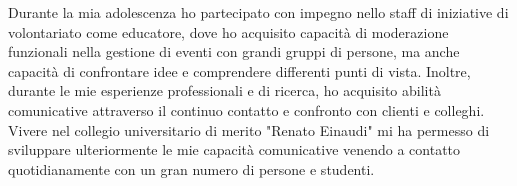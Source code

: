 {\begin{cvskills}


\end{cvskills}
\vspace{-5mm}
\begin{cvparagraph}
  Durante la mia adolescenza ho partecipato con impegno nello staff di iniziative di volontariato come educatore, dove ho acquisito capacità di moderazione funzionali nella gestione di eventi con grandi gruppi di persone, ma anche capacità di confrontare idee e comprendere differenti punti di vista. Inoltre, durante le mie esperienze professionali e di ricerca, ho acquisito abilità comunicative attraverso il continuo contatto e confronto con clienti e colleghi. Vivere nel collegio universitario di merito "Renato Einaudi" mi ha permesso di sviluppare ulteriormente le mie capacità comunicative venendo a contatto quotidianamente con un gran numero di persone e studenti.
\end{cvparagraph}
}